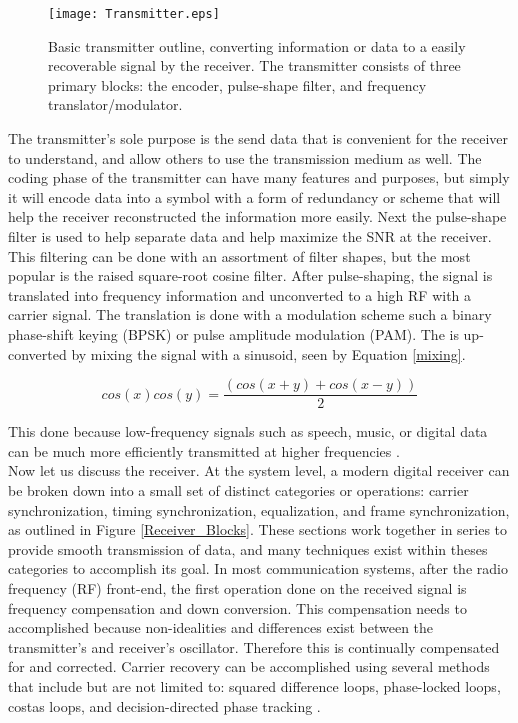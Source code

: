 \begin{figure}[!ht]\label{fig:Transmitter_System_Diagram}
\centering
\texttt{[image: Transmitter.eps]}
\caption{Basic transmitter outline, converting information or data to a easily recoverable signal by the receiver.  The transmitter consists of three primary blocks: the encoder, pulse-shape filter, and frequency translator/modulator.}
\end{figure}

The transmitter's sole purpose is the send data that is convenient for the receiver to understand, and allow others to use the transmission medium as well.  The coding phase of the transmitter can have many features and purposes, but simply it will encode data into a symbol with a form of redundancy or scheme that will help the receiver reconstructed the information more easily.  Next the pulse-shape filter is used to help separate data and help maximize the SNR at the receiver.  This filtering can be done with an assortment of filter shapes, but the most popular is the raised square-root cosine filter.  After pulse-shaping, the signal is translated into frequency information and unconverted to a high RF with a carrier signal.  The translation is done with a modulation scheme such a binary phase-shift keying (BPSK) or pulse amplitude modulation (PAM).  The is up-converted by mixing the signal with a sinusoid, seen by Equation \eqref{mixing}.

\begin{equation}[!ht]\label{mixing}
cos(x)cos(y)=\frac{(cos(x+y)+cos(x-y))}{2}
\end{equation}

This done because low-frequency signals such as speech, music, or digital data can be much more efficiently transmitted at higher frequencies \cite{9}.\\

Now let us discuss the receiver.  At the system level, a modern digital receiver can be broken down into a small set of distinct categories or operations: carrier synchronization, timing synchronization, equalization, and frame synchronization, as outlined in Figure \ref{Receiver_Blocks}.  These sections work together in series to provide smooth transmission of data, and many techniques exist within theses categories to accomplish its goal.  In most communication systems, after the radio frequency (RF) front-end, the first operation done on the received signal is frequency compensation and down conversion.  This compensation needs to accomplished because non-idealities and differences exist between the transmitter's and receiver's oscillator.  Therefore this is continually compensated for and corrected.  Carrier recovery can be accomplished using several methods that include but are not limited to: squared difference loops, phase-locked loops, costas loops, and decision-directed phase tracking \cite{9}.\\

